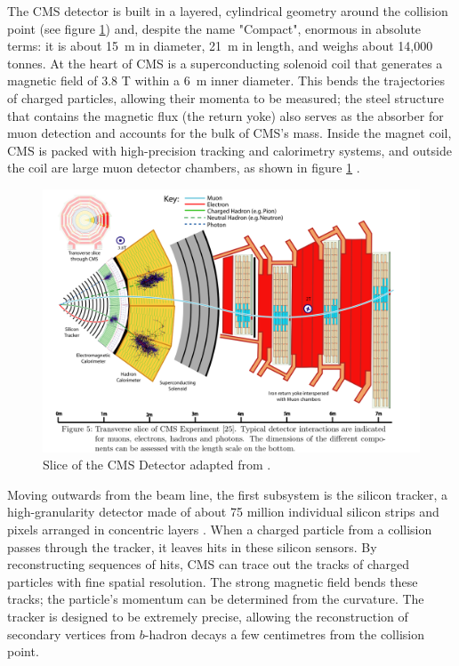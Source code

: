 The CMS detector is built in a layered, cylindrical geometry around the collision point (see figure \ref{fig:cms_overview}) and, despite the name "Compact", enormous in absolute terms: it is about 15~m in diameter, 21~m in length, and weighs about 14,000 tonnes. At the heart of CMS is a superconducting solenoid coil that generates a magnetic field of 3.8 T within a 6~m inner diameter. This bends the trajectories of charged particles, allowing their momenta to be measured; the steel structure that contains the magnetic flux (the return yoke) also serves as the absorber for muon detection and accounts for the bulk of CMS’s mass. Inside the magnet coil, CMS is packed with high-precision tracking and calorimetry systems, and outside the coil are large muon detector chambers, as shown in figure \ref{fig:cms_overview} \cite{CMS}.

\begin{figure}[h]
\centering
    \includegraphics[width=15cm]{media/cms_cutview.png}
    \caption{Slice of the CMS Detector adapted from \cite{Sirunyan_2017}.}
    \label{fig:cms_overview}
\end{figure}

Moving outwards from the beam line, the first subsystem is the silicon tracker, a high-granularity detector made of about 75 million individual silicon strips and pixels arranged in concentric layers \cite{CMS}. When a charged particle from a collision passes through the tracker, it leaves hits in these silicon sensors. By reconstructing sequences of hits, CMS can trace out the tracks of charged particles with fine spatial resolution. The strong magnetic field bends these tracks; the particle’s momentum can be determined from the curvature. The tracker is designed to be extremely precise, allowing the reconstruction of secondary vertices from $b$-hadron decays a few centimetres from the collision point.

